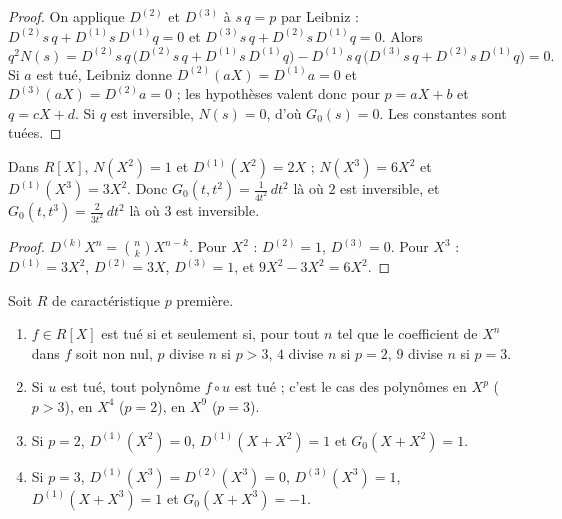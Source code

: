 \begin{proof}
On applique $D^{(2)}$ et $D^{(3)}$ à $s\,q = p$ par Leibniz : $D^{(2)}s\,q + D^{(1)}s\,D^{(1)}q = 0$ et $D^{(3)}s\,q + D^{(2)}s\,D^{(1)}q = 0$. Alors
\[
q^2 N(s) = D^{(2)}s\,q\,\bigl(D^{(2)}s\,q + D^{(1)}s\,D^{(1)}q\bigr) - D^{(1)}s\,q\,\bigl(D^{(3)}s\,q + D^{(2)}s\,D^{(1)}q\bigr) = 0 .
\]
Si $a$ est tué, Leibniz donne $D^{(2)}(aX) = D^{(1)}a = 0$ et $D^{(3)}(aX) = D^{(2)}a = 0$ ; les hypothèses valent donc pour $p = aX + b$ et $q = cX + d$. Si $q$ est inversible, $N(s) = 0$, d'où $G_0(s) = 0$. Les constantes sont tuées.
\end{proof}

\begin{enonce}
Dans $R[X]$, $N(X^2) = 1$ et $D^{(1)}(X^2) = 2X$ ; $N(X^3) = 6X^2$ et $D^{(1)}(X^3) = 3X^2$. Donc $G_0(t, t^2) = \frac{1}{4t^2}\,dt^2$ là où $2$ est inversible, et $G_0(t, t^3) = \frac{2}{3t^2}\,dt^2$ là où $3$ est inversible.
\end{enonce}

\begin{proof}
$D^{(k)} X^n = \binom nk X^{n-k}$. Pour $X^2$ : $D^{(2)} = 1$, $D^{(3)} = 0$. Pour $X^3$ : $D^{(1)} = 3X^2$, $D^{(2)} = 3X$, $D^{(3)} = 1$, et $9X^2 - 3X^2 = 6X^2$.
\end{proof}

\begin{enonce}
Soit $R$ de caractéristique $p$ première.
\begin{enumerate}
\item $f \in R[X]$ est tué si et seulement si, pour tout $n$ tel que le coefficient de $X^n$ dans $f$ soit non nul, $p$ divise $n$ si $p > 3$, $4$ divise $n$ si $p = 2$, $9$ divise $n$ si $p = 3$.
\item Si $u$ est tué, tout polynôme $f \circ u$ est tué ; c'est le cas des polynômes en $X^p$ ($p > 3$), en $X^4$ ($p = 2$), en $X^9$ ($p = 3$).
\item Si $p = 2$, $D^{(1)}(X^2) = 0$, $D^{(1)}(X + X^2) = 1$ et $G_0(X + X^2) = 1$.
\item Si $p = 3$, $D^{(1)}(X^3) = D^{(2)}(X^3) = 0$, $D^{(3)}(X^3) = 1$, $D^{(1)}(X + X^3) = 1$ et $G_0(X + X^3) = -1$.
\end{enumerate}
\end{enonce}

